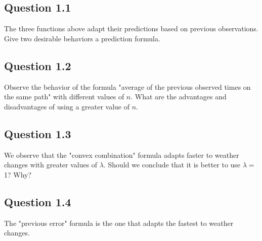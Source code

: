 \documentclass[letterpaper,12pt]{article}
\begin{document}
	
	
	\subsection*{Question 1.1}
	
	The three functions above adapt their predictions based on previous observations. Give two desirable behaviors a prediction formula.
	

	
	
	
	
	
	
	\subsection*{Question 1.2}
	
	Observe the behavior of the formula "average of the previous observed times on the same path" with different values of $n$. What are the advantages and disadvantages of using a greater value of $ n $.
	
	
	\subsection*{Question 1.3}
	
	We observe that the "convex combination" formula adapts faster to weather changes with greater values of $\lambda$. Should we conclude that it is better to use $ \lambda = $ 1? Why?
	
	
	\subsection*{Question 1.4}
	
	The "previous error" formula is the one that adapts the fastest to weather changes. 
	
\end{document}
